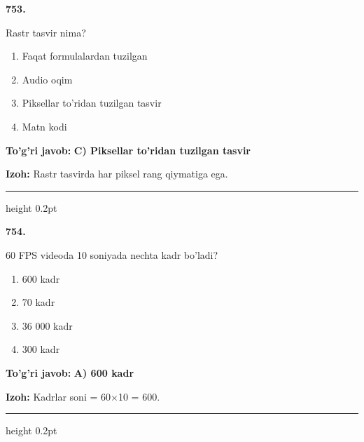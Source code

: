 \documentclass[10pt,a4paper,oneside]{article}
\begin{document}
\noindent\textbf{\color{ink}753.}
\par
Rastr tasvir nima?
\begin{enumerate}[label=\Alph*),leftmargin=9mm]
\item Faqat formulalardan tuzilgan
\item Audio oqim
\item Piksellar to'ridan tuzilgan tasvir
\item Matn kodi
\end{enumerate}
\begin{tcolorbox}[enhanced,breakable,colback=teal!4,colframe=teal!50!black,boxrule=0.5pt,arc=1.1mm,left=3mm,right=3mm,top=1.7mm,bottom=1.7mm,before skip=2mm,after skip=2mm]
\textbf{\color{teal}To'g'ri javob:} \textbf{C) Piksellar to'ridan tuzilgan tasvir}
\par\smallskip
\textbf{Izoh:} Rastr tasvirda har piksel rang qiymatiga ega.
\end{tcolorbox}
\vspace{2mm}\hrule height 0.2pt \vspace{3mm}

\noindent\textbf{\color{ink}754.}
\par
60 FPS videoda 10 soniyada nechta kadr bo'ladi?
\begin{enumerate}[label=\Alph*),leftmargin=9mm]
\item 600 kadr
\item 70 kadr
\item 36 000 kadr
\item 300 kadr
\end{enumerate}
\begin{tcolorbox}[enhanced,breakable,colback=teal!4,colframe=teal!50!black,boxrule=0.5pt,arc=1.1mm,left=3mm,right=3mm,top=1.7mm,bottom=1.7mm,before skip=2mm,after skip=2mm]
\textbf{\color{teal}To'g'ri javob:} \textbf{A) 600 kadr}
\par\smallskip
\textbf{Izoh:} Kadrlar soni = 60\ensuremath{\times}10 = 600.
\end{tcolorbox}
\vspace{2mm}\hrule height 0.2pt \vspace{3mm}
\end{document}
